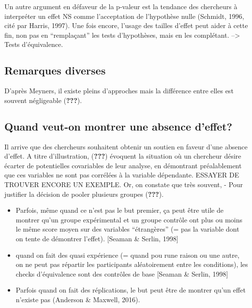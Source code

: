 \documentclass[
  english,
  man]{apa6}
\begin{document}
Un autre argument en défaveur de la p-valeur est la tendance des chercheurs à interpréter un effet NS comme l'acceptation de l'hypothèse nulle (Schmidt, 1996, cité par Harris, 1997). Une fois encore, l'usage des tailles d'effet peut aider à cette fin, non pas en \enquote{remplaçant} les tests d'hypothèses, mais en les complétant. --\textgreater{} Tests d'équivalence.

\hypertarget{remarques-diverses}{%
\subsection{Remarques diverses}\label{remarques-diverses}}

D'après Meyners, il existe pleins d'approches mais la différence entre elles est souvent négligeable ({\textbf{???}}).

\hypertarget{quand-veut-on-montrer-une-absence-deffet}{%
\subsection{Quand veut-on montrer une absence d'effet?}\label{quand-veut-on-montrer-une-absence-deffet}}

Il arrive que des chercheurs souhaitent obtenir un soutien en faveur d'une absence d'effet. A titre d'illustration, ({\textbf{???}}) évoquent la situation où un chercheur désire écarter de potentielles covariables de leur analyse, en démontrant préalablement que ces variables ne sont pas corrélées à la variable dépendante. ESSAYER DE TROUVER ENCORE UN EXEMPLE. Or, on constate que très souvent,
- Pour justifier la décision de pooler plusieurs groupes ({\textbf{???}}).

\begin{itemize}
\item
  Parfois, même quand ce n'est pas le but premier, ça peut être utile de montrer qu'un groupe expérimental et un groupe contrôle ont plus ou moins le même score moyen sur des variables \enquote{étrangères} (= pas la variable dont on tente de démontrer l'effet). {[}Seaman \& Serlin, 1998{]}
\item
  quand on fait des quasi expérience (= quand pou rune raison ou une autre, on ne peut pas répartir les participants aléatoirement entre les conditions), les checks d'équivalence sont des contrôles de base {[}Seaman \& Serlin, 1998{]}
\item
  Parfois quand on fait des réplications, le but peut être de montrer qu'un effet n'existe pas (Anderson \& Maxwell, 2016).
\end{itemize}
\end{document}
